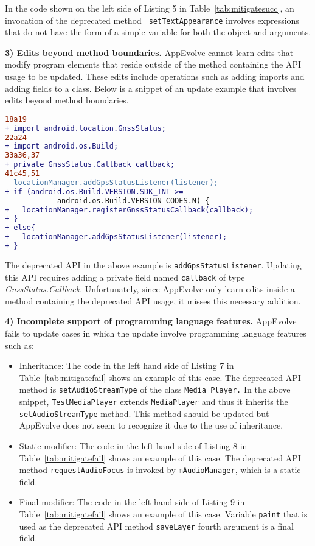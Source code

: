 In the code shown on the left side of Listing 5 in
Table~\ref{tab:mitigatesucc}, an invocation of the deprecated method {\tt
setTextAppearance} involves expressions that do not have the form
of a simple variable for both the object and arguments.

\vspace{0.25\baselineskip}\noindent\textbf{3) Edits beyond method boundaries.} AppEvolve cannot learn edits that modify program elements that reside outside of the method containing the API usage to be updated. These edits include operations such as adding imports and adding fields to a class. Below is a snippet of an update example that involves edits beyond method boundaries.
\begin{lstlisting}[language=diff,numbers=none,caption=Edits that add imports and a private field,captionpos=b]
18a19
+ import android.location.GnssStatus;
22a24
+ import android.os.Build;
33a36,37
+ private GnssStatus.Callback callback;
41c45,51
- locationManager.addGpsStatusListener(listener);
+ if (android.os.Build.VERSION.SDK_INT >= 
            android.os.Build.VERSION_CODES.N) {
+   locationManager.registerGnssStatusCallback(callback);
+ }
+ else{
+   locationManager.addGpsStatusListener(listener);
+ }
\end{lstlisting}
The deprecated API in the above example is {\tt addGpsStatusListener}. Updating this API requires adding a private field named {\tt callback} of type {\em GnssStatus.Callback}. Unfortunately, since AppEvolve only learn edits inside a method containing the deprecated API usage, it misses this necessary addition.

\vspace{0.25\baselineskip}\noindent\textbf{4) Incomplete support of programming language features.} AppEvolve fails to update cases in which the update involve programming language features such as:
\begin{itemize}
\item Inheritance: The code in the left hand side of Listing 7 in Table~\ref{tab:mitigatefail} shows an example of this case.  The deprecated API method is {\tt setAudioStreamType} of the class {\tt Media Player.} In the above snippet, {\tt TestMediaPlayer} extends {\tt MediaPlayer} and thus it inherits the {\tt setAudioStreamType} method. This method should be updated but AppEvolve does not seem to recognize it due to the use of inheritance.
\item Static modifier:  The code in the left hand side of Listing 8 in Table~\ref{tab:mitigatefail} shows an example of this case.  The deprecated API method {\tt requestAudioFocus} is invoked by {\tt mAudioManager}, which is a static field.

\item Final modifier: The code in the left hand side of Listing 9 in Table~\ref{tab:mitigatefail} shows an example of this case.  Variable {\tt paint} that is used as the deprecated API method {\tt saveLayer} fourth argument is a final field.

\end{itemize}

